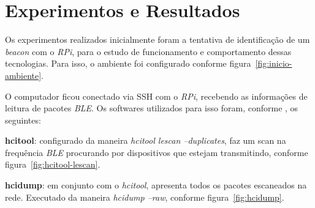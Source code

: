 \documentclass[
	12pt,				%
	openright,			%
	oneside,			%
	a4paper,			%
	chapter=TITLE,		%
	english,			%
	brazil				%
	]{abntex2}
\begin{document}
{%
\chapter{Experimentos e Resultados}

Os experimentos realizados inicialmente foram a tentativa de identificação de um \textit{beacon} com o \textit{RPi}, para o estudo de funcionamento e comportamento dessas tecnologias. Para isso, o ambiente foi configurado conforme figura~\ref{fig:inicio-ambiente}. 

\begin{figure}[h!]
\end{figure}

O computador ficou conectado via SSH com o \textit{RPi}, recebendo as informações de leitura de pacotes \textit{BLE}. Os softwares utilizados para isso foram, conforme , os seguintes:

\begin{alineas}
	\item \textbf{hcitool}: configurado da maneira \textit{hcitool lescan --duplicates}, faz um scan na frequência \textit{BLE} procurando por dispositivos que estejam transmitindo, conforme figura~\ref{fig:hcitool-lescan}.
	\item \textbf{hcidump}: em conjunto com o \textit{hcitool}, apresenta todos os pacotes escaneados na rede. Executado da maneira \textit{hcidump --raw}, conforme figura~\ref{fig:hcidump}.
\end{alineas}

}
\end{document}
